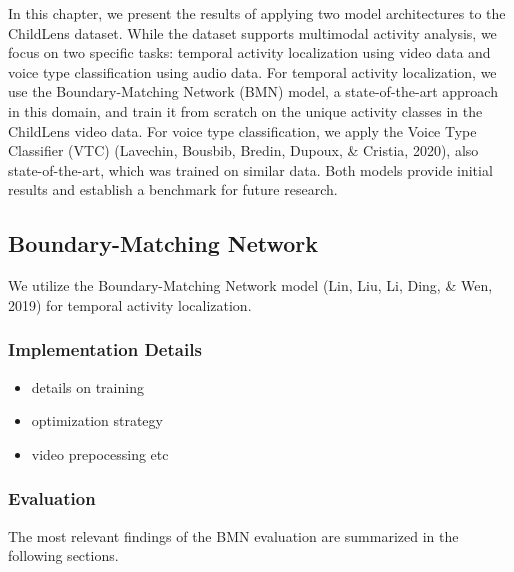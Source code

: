 \documentclass[
  man,floatsintext]{apa6}
\providecommand{\tightlist}{%
  \setlength{\itemsep}{0pt}\setlength{\parskip}{0pt}}
\begin{document}
In this chapter, we present the results of applying two model architectures to the ChildLens dataset. While the dataset supports multimodal activity analysis, we focus on two specific tasks: temporal activity localization using video data and voice type classification using audio data. For temporal activity localization, we use the Boundary-Matching Network (BMN) model, a state-of-the-art approach in this domain, and train it from scratch on the unique activity classes in the ChildLens video data. For voice type classification, we apply the Voice Type Classifier (VTC) (Lavechin, Bousbib, Bredin, Dupoux, \& Cristia, 2020), also state-of-the-art, which was trained on similar data. Both models provide initial results and establish a benchmark for future research.

\subsection{Boundary-Matching Network}\label{boundary-matching-network}

We utilize the Boundary-Matching Network model (Lin, Liu, Li, Ding, \& Wen, 2019) for temporal activity localization.

\subsubsection{Implementation Details}\label{implementation-details}

\begin{itemize}
\tightlist
\item
  details on training
\item
  optimization strategy
\item
  video prepocessing etc
\end{itemize}

\subsubsection{Evaluation}\label{evaluation}

The most relevant findings of the BMN evaluation are summarized in the following sections.
\end{document}
